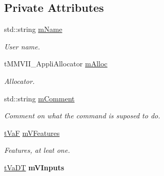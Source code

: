 \subsection*{Private Attributes}
\begin{DoxyCompactItemize}
\item 
std\+::string \hyperlink{classMMVII_1_1cSpecMMVII__Appli_ad9d6eab21bc4be47f3c47194d2403e25}{m\+Name}\hypertarget{classMMVII_1_1cSpecMMVII__Appli_ad9d6eab21bc4be47f3c47194d2403e25}{}\label{classMMVII_1_1cSpecMMVII__Appli_ad9d6eab21bc4be47f3c47194d2403e25}

\begin{DoxyCompactList}\small\item\em User name. \end{DoxyCompactList}\item 
t\+M\+M\+V\+I\+I\+\_\+\+Appli\+Allocator \hyperlink{classMMVII_1_1cSpecMMVII__Appli_a9426de1f5cc350467767a06455141db3}{m\+Alloc}\hypertarget{classMMVII_1_1cSpecMMVII__Appli_a9426de1f5cc350467767a06455141db3}{}\label{classMMVII_1_1cSpecMMVII__Appli_a9426de1f5cc350467767a06455141db3}

\begin{DoxyCompactList}\small\item\em Allocator. \end{DoxyCompactList}\item 
std\+::string \hyperlink{classMMVII_1_1cSpecMMVII__Appli_a3eedae3ba7a530892b0831169c8cc8fc}{m\+Comment}\hypertarget{classMMVII_1_1cSpecMMVII__Appli_a3eedae3ba7a530892b0831169c8cc8fc}{}\label{classMMVII_1_1cSpecMMVII__Appli_a3eedae3ba7a530892b0831169c8cc8fc}

\begin{DoxyCompactList}\small\item\em Comment on what the command is suposed to do. \end{DoxyCompactList}\item 
\hyperlink{classMMVII_1_1cSpecMMVII__Appli_a3af3559a929dd6b4e691685fcf65c82f}{t\+VaF} \hyperlink{classMMVII_1_1cSpecMMVII__Appli_a0f7380547f4624afb9bae20f028119bd}{m\+V\+Features}\hypertarget{classMMVII_1_1cSpecMMVII__Appli_a0f7380547f4624afb9bae20f028119bd}{}\label{classMMVII_1_1cSpecMMVII__Appli_a0f7380547f4624afb9bae20f028119bd}

\begin{DoxyCompactList}\small\item\em Features, at leat one. \end{DoxyCompactList}\item 
\hyperlink{classMMVII_1_1cSpecMMVII__Appli_a176c2d528029d322f10e428059c85b06}{t\+Va\+DT} {\bfseries m\+V\+Inputs}\hypertarget{classMMVII_1_1cSpecMMVII__Appli_a908f17744e642f648af95f841ced9191}{}\label{classMMVII_1_1cSpecMMVII__Appli_a908f17744e642f648af95f841ced9191}


\end{DoxyCompactItemize}
